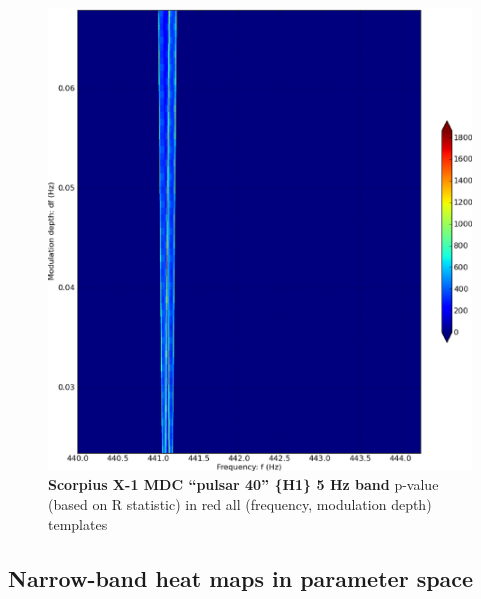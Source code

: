 \begin{figure}
\begin{center}
\includegraphics[width=0.8\paperwidth,height=0.62\paperheight]{bandH1-bold.eps}


\caption{
\textbf{Scorpius X-1 MDC ``pulsar 40'' \{H1\} 5 Hz band}
\newline p-value (based on R statistic) in red
\newline all (frequency, modulation depth) templates
}
\end{center}
\end{figure}



\subsection{Narrow-band heat maps in parameter space}



